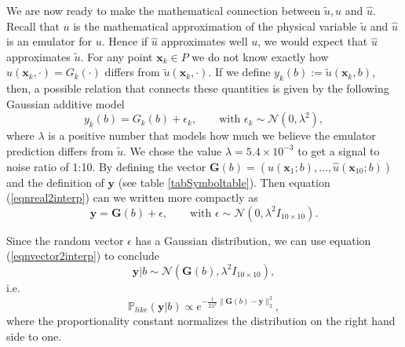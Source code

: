 \documentclass[12pt]{book}
\newcommand{\like}{\mathbb{P}_{like}}
\newcommand{\x}{\textbf{x}}
\newcommand{\y}{\textbf{y}}
\begin{document}
We are now ready to make the mathematical connection between $\tilde{u},u$ and $\hat{u}$. Recall
that $u$ is the mathematical approximation of the physical variable $\tilde{u}$ and $\hat{u}$
is an emulator for $u$. Hence if $\hat{u}$ approximates well $u$, we would expect that 
$\hat{u}$ approximates $\tilde{u}$. For any point $\x_{k}\in P$ we do not know exactly
how  $\hat{u}(\x_{k},\cdot)=G_{k}(\cdot)$ differs from $\tilde{u}(\x_{k},\cdot)$.
If we define $y_{k}(b):=\tilde{u}(\x_{k},b)$, then, a possible 
relation
that connects these quantities is given by the following Gaussian additive model \cite{Somersalo}
\begin{equation}\label{eqnreal2interp}
y_{k}(b)=G_{k}(b)+\epsilon_{k},\qquad\text{with } \epsilon_{k}\sim\mathcal{N}(0,\lambda^{2}),
\end{equation}
where $\lambda$ is  a positive number that models how much we believe  the emulator prediction differs from $\tilde{u}$. 
We chose the value $\lambda=5.4\times 10^{-3}$ to get a signal to noise ratio  of 1:10.
By defining the vector  
$\textbf{G}(b)=(\hat{u}(\x_{1};b),\ldots,\hat{u}(\x_{10};b))$ and  the definition of $\y$ 
(see table \ref{tabSymboltable}). Then equation (\ref{eqnreal2interp}) can we written more compactly as
\begin{equation}\label{eqnvector2interp}
\textbf{y}=\textbf{G}(b)+\epsilon,\qquad\text{with }\epsilon\sim\mathcal{N}(0,\lambda^{2} I_{10\times 10}).
\end{equation}


Since the random vector $\epsilon$ has a Gaussian distribution, we can use equation (\ref{eqnvector2interp})
to conclude 
\begin{equation*}
\textbf{y}|b\sim \mathcal{N}(\textbf{G}(b),\lambda^{2} I_{10\times 10}),
\end{equation*}
i.e.
\begin{equation}\label{eqnlikelihoodtoyproblem}
\like(\textbf{y}|b)\propto e^{-\frac{1}{2\lambda^{2}}\|\textbf{G}(b)-\textbf{y}\|_{2}^{2}},
\end{equation}
where the proportionality constant normalizes the distribution on the right hand side to one. 
\newline
\end{document}
